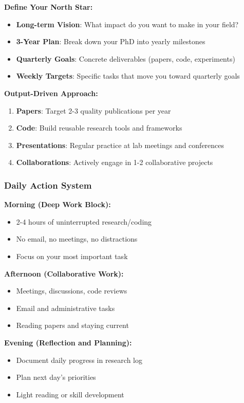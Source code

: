 \documentclass[11pt,a4paper]{article}
\begin{document}
\textbf{Define Your North Star:}
\begin{itemize}
    \item \textbf{Long-term Vision}: What impact do you want to make in your field?
    \item \textbf{3-Year Plan}: Break down your PhD into yearly milestones
    \item \textbf{Quarterly Goals}: Concrete deliverables (papers, code, experiments)
    \item \textbf{Weekly Targets}: Specific tasks that move you toward quarterly goals
\end{itemize}

\textbf{Output-Driven Approach:}
\begin{enumerate}
    \item \textbf{Papers}: Target 2-3 quality publications per year
    \item \textbf{Code}: Build reusable research tools and frameworks
    \item \textbf{Presentations}: Regular practice at lab meetings and conferences
    \item \textbf{Collaborations}: Actively engage in 1-2 collaborative projects
\end{enumerate}

\subsubsection{Daily Action System}

\begin{tcolorbox}[colback=green!10,colframe=green!50,title=The PhD Daily Routine]
\textbf{Morning (Deep Work Block):}
\begin{itemize}
    \item 2-4 hours of uninterrupted research/coding
    \item No email, no meetings, no distractions
    \item Focus on your most important task
\end{itemize}

\textbf{Afternoon (Collaborative Work):}
\begin{itemize}
    \item Meetings, discussions, code reviews
    \item Email and administrative tasks
    \item Reading papers and staying current
\end{itemize}

\textbf{Evening (Reflection and Planning):}
\begin{itemize}
    \item Document daily progress in research log
    \item Plan next day's priorities
    \item Light reading or skill development
\end{itemize}
\end{tcolorbox}
\end{document}
